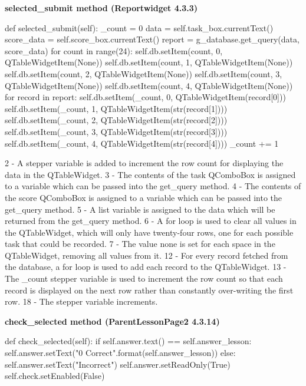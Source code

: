 \textbf{selected\_submit method (Reportwidget 4.3.3)}

\begin{python}
def selected_submit(self):
        _count = 0
        data = self.task_box.currentText()
        score_data = self.score_box.currentText()
        report = g_database.get_query(data, score_data)
        for count in range(24):
            self.db.setItem(count, 0, QTableWidgetItem(None))
            self.db.setItem(count, 1, QTableWidgetItem(None))
            self.db.setItem(count, 2, QTableWidgetItem(None))
            self.db.setItem(count, 3, QTableWidgetItem(None))
            self.db.setItem(count, 4, QTableWidgetItem(None))
        for record in report:
            self.db.setItem(_count, 0, QTableWidgetItem(record[0]))
            self.db.setItem(_count, 1, QTableWidgetItem(str(record[1])))
            self.db.setItem(_count, 2, QTableWidgetItem(str(record[2])))
            self.db.setItem(_count, 3, QTableWidgetItem(str(record[3])))
            self.db.setItem(_count, 4, QTableWidgetItem(str(record[4])))
            _count += 1
\end{python}

2 - A stepper variable is added to increment the row count for displaying the data in the QTableWidget.
3 - The contents of the task QComboBox is assigned to a variable which can be passed into the get\_query method.
4 - The contents of the score QComboBox is assigned to a variable which can be passed into the get\_query method.
5 - A list variable is assigned to the data which will be returned from the get\_query method.
6 - A for loop is used to clear all values in the QTableWidget, which will only have twenty-four rows, one for each possible task that could be recorded.
7 - The value none is set for each space in the QTableWidget, removing all values from it.
12 - For every record fetched from the database, a for loop is used to add each record to the QTableWidget.
13 - The \_count stepper variable is used to increment the row count so that each record is displayed on the next row rather than constantly over-writing the first row.
18 - The stepper variable increments.

\textbf{check\_selected method (ParentLessonPage2 4.3.14)}

\begin{python}
def check_selected(self):
        if self.answer.text() == self.answer_lesson:
            self.answer.setText("{0} Correct".format(self.answer_lesson))
        else:
            self.answer.setText("Incorrect")
        self.answer.setReadOnly(True)
        self.check.setEnabled(False)
\end{python}

